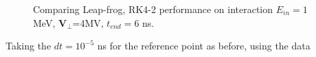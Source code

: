 \documentclass[a4paper,oneside,12pt]{report}
\numberwithin{equation}{chapter}
\begin{document}
\begin{figure}[H]
    \centering
    \vspace{15pt}
    \vspace{15pt}
    \caption{Comparing Leap-frog, RK4-2 performance on \eE interaction $E_{in}=1$MeV, $\textbf{V}_{\perp}$=4MV, $t_{end}=6$ ns.}
    \label{fig:lf_rk2_perp_stat_E_comparison}
\end{figure}
Taking the $dt=10^{-5}$ ns for the reference point as before, using the data
\end{document}
